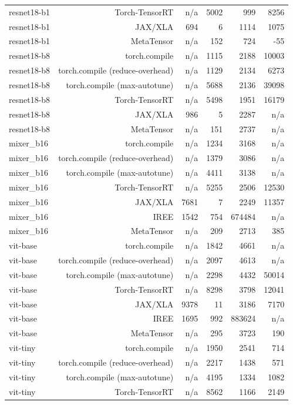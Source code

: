 \begin{tabular}{lrrrrr}
resnet18-b1 & Torch-TensorRT & n/a & 5002 & 999 & 8256 \\
resnet18-b1 & JAX/XLA & 694 & 6 & 1114 & 1075 \\
resnet18-b1 & MetaTensor & n/a & 152 & 724 & -55 \\
resnet18-b8 & torch.compile & n/a & 1115 & 2188 & 10003 \\
resnet18-b8 & torch.compile (reduce-overhead) & n/a & 1129 & 2134 & 6273 \\
resnet18-b8 & torch.compile (max-autotune) & n/a & 5688 & 2136 & 39098 \\
resnet18-b8 & Torch-TensorRT & n/a & 5498 & 1951 & 16179 \\
resnet18-b8 & JAX/XLA & 986 & 5 & 2287 & n/a \\
resnet18-b8 & MetaTensor & n/a & 151 & 2737 & n/a \\
mixer\_b16 & torch.compile & n/a & 1234 & 3168 & n/a \\
mixer\_b16 & torch.compile (reduce-overhead) & n/a & 1379 & 3086 & n/a \\
mixer\_b16 & torch.compile (max-autotune) & n/a & 4411 & 3138 & n/a \\
mixer\_b16 & Torch-TensorRT & n/a & 5255 & 2506 & 12530 \\
mixer\_b16 & JAX/XLA & 7681 & 7 & 2249 & 11357 \\
mixer\_b16 & IREE & 1542 & 754 & 674484 & n/a \\
mixer\_b16 & MetaTensor & n/a & 209 & 2713 & 385 \\
vit-base & torch.compile & n/a & 1842 & 4661 & n/a \\
vit-base & torch.compile (reduce-overhead) & n/a & 2097 & 4613 & n/a \\
vit-base & torch.compile (max-autotune) & n/a & 2298 & 4432 & 50014 \\
vit-base & Torch-TensorRT & n/a & 8298 & 3798 & 12041 \\
vit-base & JAX/XLA & 9378 & 11 & 3186 & 7170 \\
vit-base & IREE & 1695 & 992 & 883624 & n/a \\
vit-base & MetaTensor & n/a & 295 & 3723 & 190 \\
vit-tiny & torch.compile & n/a & 1950 & 2541 & 714 \\
vit-tiny & torch.compile (reduce-overhead) & n/a & 2217 & 1438 & 571 \\
vit-tiny & torch.compile (max-autotune) & n/a & 4195 & 1334 & 1082 \\
vit-tiny & Torch-TensorRT & n/a & 8562 & 1166 & 2149 \\

\end{tabular}

